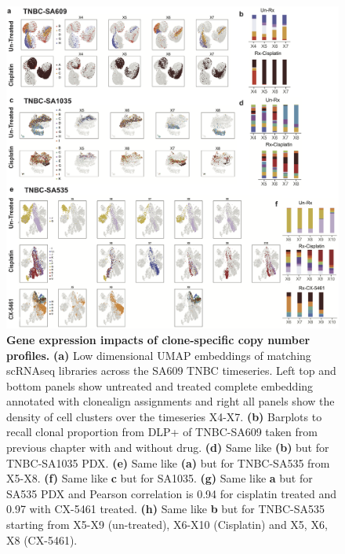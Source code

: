 \begin{figure}
\centering
\includegraphics[width=\textwidth]{Figures/chap5/EmbeddingsRNA.png}
	
\caption[Gene expression impacts of clone-specific copy number profiles]
	{\small
	\textbf{Gene expression impacts of clone-specific copy number profiles.}
	    \textbf{(a)} Low dimensional \ac{UMAP} embeddings of matching scRNAseq libraries across the SA609 TNBC timeseries. Left top and bottom panels show untreated and treated complete embedding annotated with clonealign assignments and right all panels show the density of cell clusters over the timeseries X4-X7.
	     \textbf{(b)} Barplots to recall clonal proportion from DLP+ of TNBC-SA609 taken from previous chapter with and without drug. 
	     \textbf{(d)} Same like \textbf{(b)} but for TNBC-SA1035 PDX. \textbf{(e)} Same like \textbf{(a)} but for TNBC-SA535  from X5-X8. \textbf{(f)} Same like \textbf{c} but for SA1035. \textbf{(g)} Same like \textbf{a} but for SA535 PDX and Pearson correlation is 0.94 for cisplatin treated and 0.97 with CX-5461 treated. \textbf{(h)} Same like \textbf{b} but for TNBC-SA535 starting from X5-X9 (un-treated), X6-X10 (Cisplatin) and X5, X6, X8 (CX-5461).
	}
	\label{fig:EmbeddingsRNA}
\end{figure}


